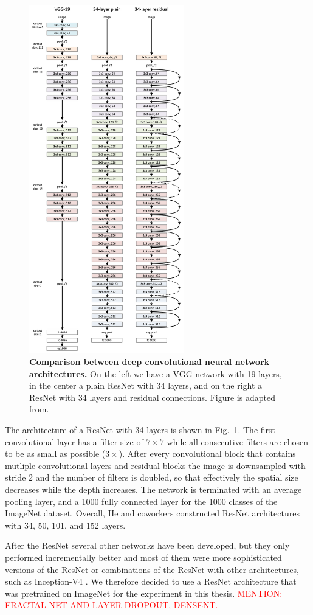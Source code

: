 \begin{figure}[h!]
	\centering
	\captionsetup{width=1\linewidth}
	\includegraphics[width=0.6\textwidth]{Figures/resnet_architecture.png}
	\caption{\textbf{Comparison between deep convolutional neural network architectures.} On the left we have a VGG network with 19 layers, in the center a plain ResNet with 34 layers, and on the right a ResNet with 34 layers and residual connections. Figure is adapted from\parencite{he2015}.}
	\label{fig:resnet}
\end{figure}

The architecture of a ResNet with 34 layers is shown in Fig.~\ref{fig:resnet}. The first convolutional layer has a filter size of $7\times7$ while all consecutive filters are chosen to be as small as possible ($3\times$). After every convolutional block that contains mutliple convolutional layers and residual blocks the image is downsampled with stride 2 and the number of filters is doubled, so that effectively the spatial size decreases while the depth increases. The network is terminated with an average pooling layer, and a 1000 fully connected layer for the 1000 classes of the ImageNet dataset. Overall, He and coworkers constructed ResNet architectures with 34, 50, 101, and 152 layers.

After the ResNet several other networks have been developed, but they only performed incrementally better and most of them were more sophisticated versions of the ResNet or combinations of the ResNet with other architectures, such as Inception-V4 \parencite{szegedy2016}. We therefore decided to use a ResNet architecture that was pretrained on ImageNet for the experiment in this thesis. \textcolor{red}{MENTION: FRACTAL NET AND LAYER DROPOUT, DENSENT.}
